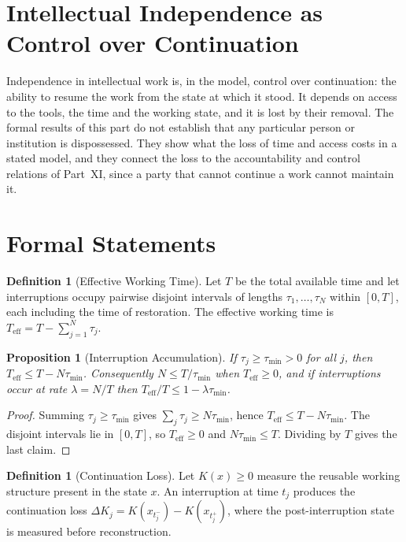 \documentclass[11pt,letterpaper]{report}
\theoremstyle{plain}
\newtheorem{proposition}[theorem]{Proposition}
\theoremstyle{definition}
\newtheorem{definition}[theorem]{Definition}
\theoremstyle{remark}
\begin{document}
\section{Intellectual Independence as Control over Continuation}

Independence in intellectual work is, in the model, control over continuation: the ability to resume the work from the state at which it stood. It depends on access to the tools, the time and the working state, and it is lost by their removal. The formal results of this part do not establish that any particular person or institution is dispossessed. They show what the loss of time and access costs in a stated model, and they connect the loss to the accountability and control relations of Part~XI, since a party that cannot continue a work cannot maintain it.

\section{Formal Statements}

\begin{definition}[Effective Working Time]\label{def:effective}
Let $T$ be the total available time and let interruptions occupy pairwise disjoint intervals of lengths $\tau_1,\dots,\tau_N$ within $[0,T]$, each including the time of restoration. The effective working time is $T_{\mathrm{eff}}=T-\sum_{j=1}^N\tau_j$.
\end{definition}

\begin{proposition}[Interruption Accumulation]\label{pr:accumulation}
If $\tau_j\ge\tau_{\min}>0$ for all $j$, then $T_{\mathrm{eff}}\le T-N\tau_{\min}$. Consequently $N\le T/\tau_{\min}$ when $T_{\mathrm{eff}}\ge0$, and if interruptions occur at rate $\lambda=N/T$ then $T_{\mathrm{eff}}/T\le1-\lambda\tau_{\min}$.
\end{proposition}
\begin{proof}
Summing $\tau_j\ge\tau_{\min}$ gives $\sum_j\tau_j\ge N\tau_{\min}$, hence $T_{\mathrm{eff}}\le T-N\tau_{\min}$. The disjoint intervals lie in $[0,T]$, so $T_{\mathrm{eff}}\ge0$ and $N\tau_{\min}\le T$. Dividing by $T$ gives the last claim.
\end{proof}

\begin{definition}[Continuation Loss]\label{def:contloss}
Let $K(x)\ge0$ measure the reusable working structure present in the state $x$. An interruption at time $t_j$ produces the continuation loss $\Delta K_j=K(x_{t_j^-})-K(x_{t_j^+})$, where the post-interruption state is measured before reconstruction.
\end{definition}
\end{document}
